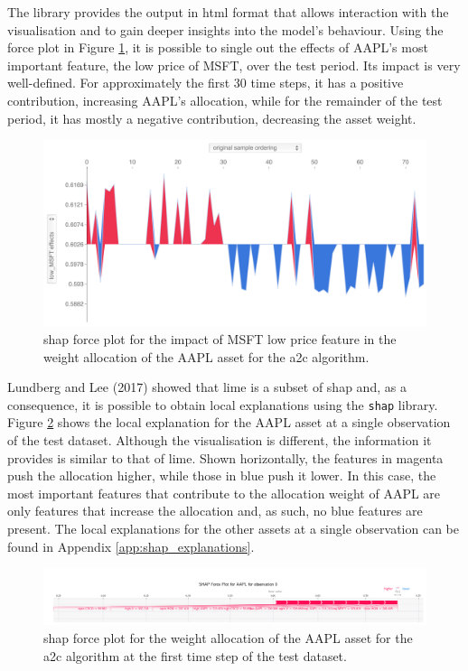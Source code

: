 The library provides the output in \acrfull{html} format that allows interaction with the visualisation and to gain deeper insights into the model's behaviour. Using the force plot in Figure \ref{fig:a2c_shap_forceplot_aapl_lowmsft}, it is possible to single out the effects of AAPL's most important feature, the low price of MSFT, over the test period. Its impact is very well-defined. For approximately the first 30 time steps, it has a positive contribution, increasing AAPL's allocation, while for the remainder of the test period, it has mostly a negative contribution, decreasing the asset weight.

\begin{figure}
    \centering
    \includegraphics[width=\textwidth]{figures/a2c_shap_forceplot_aapl_lowmsft.png}
    \caption{\acrshort{shap} force plot for the impact of MSFT low price feature in the weight allocation of the AAPL asset for the \acrshort{a2c} algorithm.}
    \label{fig:a2c_shap_forceplot_aapl_lowmsft}
\end{figure}

Lundberg and Lee (2017) \cite{Lundberg2017} showed that \acrshort{lime} is a subset of \acrshort{shap} and, as a consequence, it is possible to obtain local explanations using the \texttt{shap} library. Figure \ref{fig:a2c_shap_forceplot_singleobs_aapl} shows the local explanation for the AAPL asset at a single observation of the test dataset. Although the visualisation is different, the information it provides is similar to that of \acrshort{lime}. Shown horizontally, the features in magenta push the allocation higher, while those in blue push it lower. In this case, the most important features that contribute to the allocation weight of AAPL are only features that increase the allocation and, as such, no blue features are present. The local explanations for the other assets at a single observation can be found in Appendix \ref{app:shap_explanations}.

\begin{figure}
    \centering
    \includegraphics[width=\textwidth]{figures/a2c_shap_forceplot_singleobs_aapl.png}
    \caption{\acrshort{shap} force plot for the weight allocation of the AAPL asset for the \acrshort{a2c} algorithm at the first time step of the test dataset.}
    \label{fig:a2c_shap_forceplot_singleobs_aapl}
\end{figure}
